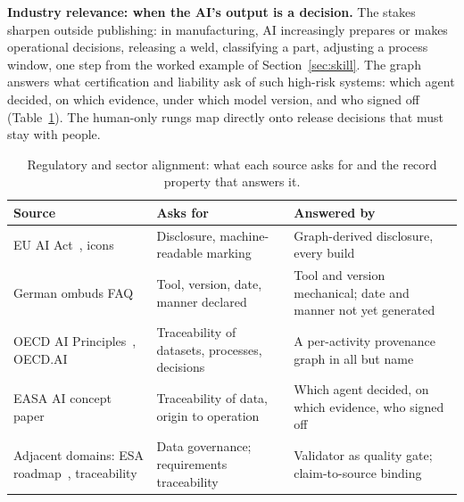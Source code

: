 \textbf{Industry relevance: when the AI's output is a decision.} The
stakes sharpen outside publishing: in manufacturing, AI increasingly
prepares or makes operational decisions, releasing a weld,
classifying a part, adjusting a process window, one step from the
worked example of Section~\ref{sec:skill}. The graph answers what
certification and liability ask of such high-risk systems: which
agent decided, on which evidence, under which model version, and who
signed off (Table~\ref{tab:align}). The human-only rungs map directly
onto release decisions that must stay with people.

\begin{table}[t]
\caption{Regulatory and sector alignment: what each source asks for
and the record property that answers it.}
\label{tab:align}
\centering
\footnotesize
\begin{tabular}{p{2.1cm}p{3.1cm}p{2.0cm}}
\toprule
Source & Asks for & Answered by \\
\midrule
EU AI Act~\cite{eu-ai-act2024}, icons~\cite{eu-ai-icons2026} & Disclosure, machine-readable marking & Graph-derived disclosure, every build \\
German ombuds FAQ~\cite{faq-ai-gwp2025} & Tool, version, date, manner declared & Tool and version mechanical; date and manner not yet generated \\
OECD AI Principles~\cite{oecd-ai-principles}, OECD.AI~\cite{oecd-aim} & Traceability of datasets, processes, decisions & A per-activity provenance graph in all but name \\
EASA AI concept paper~\cite{easa-ai-concept2024} & Traceability of data, origin to operation & Which agent decided, on which evidence, who signed off \\
Adjacent domains: ESA roadmap~\cite{esa-a2i-roadmap}, traceability~\cite{traceability1994} & Data governance; requirements traceability & Validator as quality gate; claim-to-source binding \\
\bottomrule
\end{tabular}
\end{table}

\ifextended\fi

